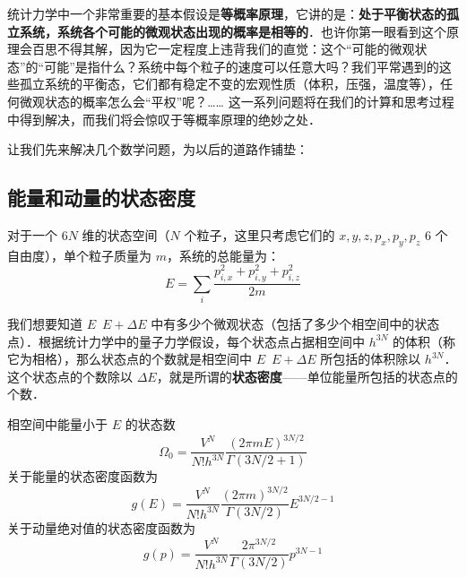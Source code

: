 
\begin{issues}
\issueDraft
\end{issues}


统计力学中一个非常重要的基本假设是\textbf{等概率原理}，它讲的是：\textbf{处于平衡状态的孤立系统，系统各个可能的微观状态出现的概率是相等的}．也许你第一眼看到这个原理会百思不得其解，因为它一定程度上违背我们的直觉：这个“可能的微观状态”的“可能”是指什么？系统中每个粒子的速度可以任意大吗？我们平常遇到的这些孤立系统的平衡态，它们都有稳定不变的宏观性质（体积，压强，温度等），任何微观状态的概率怎么会“平权”呢？…… 这一系列问题将在我们的计算和思考过程中得到解决，而我们将会惊叹于等概率原理的绝妙之处．

让我们先来解决几个数学问题，为以后的道路作铺垫：
\subsection{能量和动量的状态密度}
对于一个 $6N$ 维的状态空间（$N$ 个粒子，这里只考虑它们的 $x,y,z,p_x,p_y,p_z$ $6$ 个自由度），单个粒子质量为 $m$，系统的总能量为：
\begin{equation}
E=\sum_{i} \frac{p_{i,x}^2+p_{i,y}^2+p_{i,z}^2}{2m}
\end{equation}

我们想要知道 $E$~$E+\Delta E$ 中有多少个微观状态（包括了多少个相空间中的状态点）．根据统计力学中的量子力学假设，每个状态点占据相空间中 $h^{3N}$ 的体积（称它为相格），那么状态点的个数就是相空间中 $E$~$E+\Delta E$ 所包括的体积除以 $h^{3N}$．这个状态点的个数除以 $\Delta E$，就是所谓的\textbf{状态密度}——单位能量所包括的状态点的个数．

相空间中能量小于 $E$ 的状态数
\begin{equation}\label{IdSDp_eq2}
\Omega_0 = \frac{V^N}{N! h^{3N}} \frac{(2\pi mE)^{3N/2}}{\Gamma(3N/2+1)}
\end{equation}
关于能量的状态密度函数为
\begin{equation}\label{IdSDp_eq3}
g(E) = \frac{V^N}{N! h^{3N}} \frac{(2\pi m)^{3N/2}}{\Gamma(3N/2)} E^{3N/2 - 1}
\end{equation}
关于动量绝对值的状态密度函数为
\begin{equation}\label{IdSDp_eq4}
g(p) = \frac{V^N}{N! h^{3N}} \frac{2\pi^{3N/2}}{\Gamma(3N/2)} p^{3N - 1}
\end{equation}


